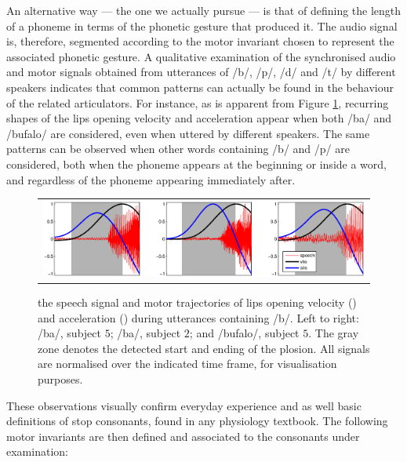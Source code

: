 An alternative way --- the one we actually pursue --- is that of defining
the length of a phoneme in terms of the phonetic gesture that produced
it. The audio signal is, therefore, segmented according to the motor
invariant chosen to represent the associated phonetic gesture.
A qualitative examination of the synchronised audio and motor
signals obtained from utterances of /b/, /p/, /d/ and /t/
by different speakers indicates that common patterns can
actually be found in the behaviour of the related articulators.
For instance, as is apparent from Figure \ref{fig:isdView}, 
recurring shapes of the lips opening velocity and acceleration appear
when both /ba/ and /bufalo/ are considered, even when uttered by different
speakers. The same patterns can be observed when other words containing
/b/ and /p/ are considered, both when the phoneme appears at the beginning
or inside a word, and regardless of the phoneme appearing immediately after.

\begin{figure}[t] \centering
  \begin{tabular}{c}
    \includegraphics[width=\textwidth]{figs/figSamples} \\
  \end{tabular}
  \caption{the speech signal and motor trajectories of lips opening
    velocity (\vlio) and acceleration (\alio) during utterances containing /b/.
    Left to right: /ba/, subject $5$; /ba/, subject $2$; and /bufalo/, subject $5$.
    The gray zone denotes the detected start and ending of the plosion. All signals
    are normalised over the indicated time frame, for visualisation purposes.}
  \label{fig:isdView}
\end{figure}

These observations visually confirm everyday experience and as well
basic definitions of stop consonants, found in any physiology textbook.
The following motor invariants are then defined and associated to the
consonants under examination:

